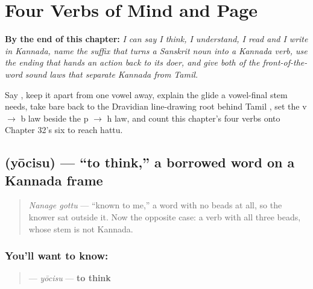 
\chapter{Four Verbs of Mind and Page}
\label{ch:ka-mind-verbs}

\begin{chapteropening}
\textbf{By the end of this chapter:} \emph{I can say I think, I understand, I read and I write in Kannada, name the suffix that turns a Sanskrit noun into a Kannada verb, use the ending that hands an action back to its doer, and give both of the front-of-the-word sound laws that separate Kannada from Tamil.}

Say   , keep it apart from  one vowel away, explain the glide a vowel-final stem needs, take bare back to the Dravidian line-drawing root behind Tamil , set the v $\to$ b law beside the p $\to$ h law, and count this chapter’s four verbs onto Chapter 32’s six to reach hattu.
\end{chapteropening}

\section[\texorpdfstring{\kn{ಯೋಚಿಸು} (yōcisu)}{ಯೋಚಿಸು (yōcisu)}]{ (yōcisu) — \textquotedblleft{}to think,\textquotedblright{} a borrowed word on a Kannada frame}

\label{lesson:KA-C33-yocisu}



\begin{quote}
\emph{Nanage gottu} — \textquotedblleft{}known to me,\textquotedblright{} a word with no beads at all, so the knower sat outside it. Now the opposite case: a verb with all three beads, whose stem is not Kannada.
\end{quote}

\subsection*{You'll want to know: }
\begin{quote}
\textbf{} — \emph{yōcisu} — \textbf{to think}
\end{quote}

